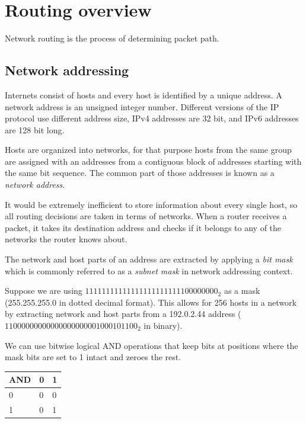 %

\chapter{Routing overview}

Network routing is the process of determining packet path.

\section{Network addressing}

Internets consist of hosts and every host is identified by a unique address. A network address is an unsigned integer number.
Different versions of the IP protocol use different address size, IPv4 addresses are 32 bit, and IPv6 addresses are 128 bit long.

Hosts are organized into networks, for that purpose hosts from the same group are assigned with an addresses from a contiguous block
of addresses starting with the same bit sequence. The common part of those addresses is known as a \emph{network address}.

It would be extremely inefficient to store information about every single host, so all routing decisions
are taken in terms of networks. When a router receives a packet, it takes its destination address and
checks if it belongs to any of the networks the router knows about.

The network and host parts of an address are extracted by applying a \emph{bit mask} which is commonly referred to as 
a \emph{subnet mask} in network addressing context.

Suppose we are using $11111111111111111111111100000000_2$ as a mask (255.255.255.0 in dotted decimal format).
This allows for 256 hosts in a network by extracting network and host parts from a 192.0.2.44 address ($1100000000000  0000000001000101100_2$ in binary).

We can use bitwise logical AND operations that keep bits at positions where the mask bits are set to 1 intact and zeroes the rest.

\begin{tabular}{|l|l|l|}
\hline
AND & 0 & 1 \\
\hline
0 & 0 & 0 \\
\hline
1 & 0 & 1 \\
\hline
\end{tabular}

